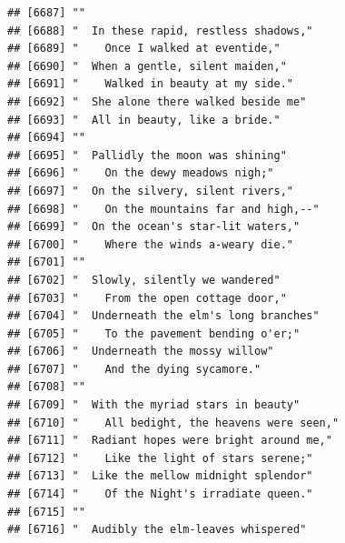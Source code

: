 \documentclass{article}\usepackage[]{graphicx}\usepackage[]{color}
\makeatletter
\newenvironment{kframe}{%
 \def\at@end@of@kframe{}%
 \ifinner\ifhmode%
  \def\at@end@of@kframe{\end{minipage}}%
  \begin{minipage}{\columnwidth}%
 \fi\fi%
 \def\FrameCommand##1{\hskip\@totalleftmargin \hskip-\fboxsep
 \colorbox{shadecolor}{##1}\hskip-\fboxsep
     \hskip-\linewidth \hskip-\@totalleftmargin \hskip\columnwidth}%
 \MakeFramed {\advance\hsize-\width
   \@totalleftmargin\z@ \linewidth\hsize
   \@setminipage}}%
 {\par\unskip\endMakeFramed%
 \at@end@of@kframe}
\newenvironment{knitrout}{}{} %
\makeatother
\begin{document}
\begin{knitrout}
\begin{kframe}
\begin{verbatim}
## [6687] ""                                                                            
## [6688] "  In these rapid, restless shadows,"                                         
## [6689] "    Once I walked at eventide,"                                              
## [6690] "  When a gentle, silent maiden,"                                             
## [6691] "    Walked in beauty at my side."                                            
## [6692] "  She alone there walked beside me"                                          
## [6693] "  All in beauty, like a bride."                                              
## [6694] ""                                                                            
## [6695] "  Pallidly the moon was shining"                                             
## [6696] "    On the dewy meadows nigh;"                                               
## [6697] "  On the silvery, silent rivers,"                                            
## [6698] "    On the mountains far and high,--"                                        
## [6699] "  On the ocean's star-lit waters,"                                           
## [6700] "    Where the winds a-weary die."                                            
## [6701] ""                                                                            
## [6702] "  Slowly, silently we wandered"                                              
## [6703] "    From the open cottage door,"                                             
## [6704] "  Underneath the elm's long branches"                                        
## [6705] "    To the pavement bending o'er;"                                           
## [6706] "  Underneath the mossy willow"                                               
## [6707] "    And the dying sycamore."                                                 
## [6708] ""                                                                            
## [6709] "  With the myriad stars in beauty"                                           
## [6710] "    All bedight, the heavens were seen,"                                     
## [6711] "  Radiant hopes were bright around me,"                                      
## [6712] "    Like the light of stars serene;"                                         
## [6713] "  Like the mellow midnight splendor"                                         
## [6714] "    Of the Night's irradiate queen."                                         
## [6715] ""                                                                            
## [6716] "  Audibly the elm-leaves whispered"                                          

\end{verbatim}
\end{kframe}
\end{knitrout}
\end{document}
